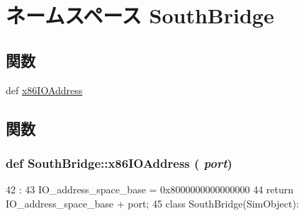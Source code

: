 \hypertarget{namespaceSouthBridge}{
\section{ネームスペース SouthBridge}
\label{namespaceSouthBridge}
}
\subsection*{関数}
\begin{DoxyCompactItemize}
\item 
def \hyperlink{namespaceSouthBridge_ad539c712396b9bb12d83649670abbc1f}{x86IOAddress}
\end{DoxyCompactItemize}


\subsection{関数}
\hypertarget{namespaceSouthBridge_ad539c712396b9bb12d83649670abbc1f}{
\subsubsection[{x86IOAddress}]{\setlength{\rightskip}{0pt plus 5cm}def SouthBridge::x86IOAddress ( {\em port})}}
\label{namespaceSouthBridge_ad539c712396b9bb12d83649670abbc1f}



\begin{DoxyCode}
42                       :
43     IO_address_space_base = 0x8000000000000000
44     return IO_address_space_base + port;
45 
class SouthBridge(SimObject):
\end{DoxyCode}
